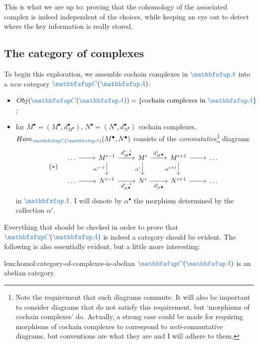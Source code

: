 This is what we are up to: proving that the cohomology of the
associated complex is indeed independent of the choices, while keeping
an eye out to detect where the key information is really stored.

\subsection{The category of complexes}
\label{subsec:homol:the-category-of-complexes}

To begin this exploration, we assemble cochain complexes in
$\categ{A}$ into a \emph{new} category $\categ{C}(\categ{A})$:
\begin{itemize}
\item
  $\Obj(\categ{C}(\categ{A})) = \{\text{cochain complexes in }
  \categ{A}\}$;
\item for $M^\bullet = (M^\bullet, d^\bullet_{M^\bullet})$,
  $N^\bullet = (N^\bullet, d^\bullet_{N^\bullet})$ cochain complexes,
  $\Hom_{\categ{C}(\categ{A})}(M^\bullet, N^\bullet)$ consists of the
  \emph{commutative}\footnote{Note the requirement that such diagrams
    commute. It will also be important to consider diagrams that do
    not satisfy this requirement, but `morphisms of cochain complexes'
    do. Actually, a strong case could be made for requiring morphisms
    of cochain complexes to correspond to \emph{anti}-commutative
    diagrams, but conventions are what they are and I will adhere to
    them.} diagrams
  \[
    (*) \quad \begin{tikzcd} \dots \arrow[r] & M^{i-1} \arrow[r,
      "d^{i-1}_{M^\bullet}"] \arrow[d, "\alpha^{i-1}"'] & M^i
      \arrow[r, "d^i_{M^\bullet}"] \arrow[d, "\alpha^i"'] & M^{i+1}
      \arrow[r]
      \arrow[d, "\alpha^{i+1}"'] & \dots \\
      \dots \arrow[r] & N^{i-1} \arrow[r, "d^{i-1}_{N^\bullet}"'] &
      N^i \arrow[r, "d^i_{N^\bullet}"'] & N^{i+1} \arrow[r] & \dots
    \end{tikzcd}
  \]
  in $\categ{A}$. I will denote by $\alpha^\bullet$ the morphism
  determined by the collection $\alpha^i$.
\end{itemize}
Everything that should be checked in order to prove that
$\categ{C}(\categ{A})$ is indeed a category should be evident. The
following is also essentially evident, but a little more interesting:

\begin{lem}{}{lem:homol:category-of-complexes-is-abelian}
  $\categ{C}(\categ{A})$ is an abelian category.
\end{lem}

